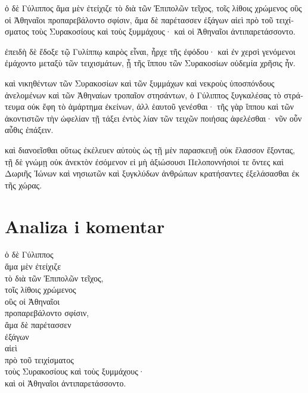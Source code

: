 {\large

\begin{greek}

\noindent ὁ δὲ Γύλιππος ἅμα μὲν ἐτείχιζε τὸ διὰ τῶν Ἐπιπολῶν τεῖχος, τοῖς λίθοις χρώμενος οὓς οἱ Ἀθηναῖοι προπαρεβάλοντο σφίσιν, ἅμα δὲ παρέτασσεν ἐξάγων αἰεὶ πρὸ τοῦ τειχίσματος τοὺς Συρακοσίους καὶ τοὺς ξυμμάχους· καὶ οἱ Ἀθηναῖοι ἀντιπαρετάσσοντο.

ἐπειδὴ δὲ ἔδοξε τῷ Γυλίππῳ καιρὸς εἶναι, ἦρχε τῆς ἐφόδου· καὶ ἐν χερσὶ γενόμενοι ἐμάχοντο μεταξὺ τῶν τειχισμάτων, ᾗ τῆς ἵππου τῶν Συρακοσίων οὐδεμία χρῆσις ἦν.

καὶ νικηθέντων τῶν Συρακοσίων καὶ τῶν ξυμμάχων καὶ νεκροὺς ὑποσπόνδους ἀνελομένων καὶ τῶν Ἀθηναίων τροπαῖον στησάντων, ὁ Γύλιππος ξυγκαλέσας τὸ στράτευμα οὐκ ἔφη τὸ ἁμάρτημα ἐκείνων, ἀλλ ἑαυτοῦ γενέσθαι· τῆς γὰρ ἵππου καὶ τῶν ἀκοντιστῶν τὴν ὠφελίαν τῇ τάξει ἐντὸς λίαν τῶν τειχῶν ποιήσας ἀφελέσθαι· νῦν οὖν αὖθις ἐπάξειν.

καὶ διανοεῖσθαι οὕτως ἐκέλευεν αὐτοὺς ὡς τῇ μὲν παρασκευῇ οὐκ ἔλασσον ἕξοντας, τῇ δὲ γνώμῃ οὐκ ἀνεκτὸν ἐσόμενον εἰ μὴ ἀξιώσουσι Πελοποννήσιοί τε ὄντες καὶ Δωριῆς Ἰώνων καὶ νησιωτῶν καὶ ξυγκλύδων ἀνθρώπων κρατήσαντες ἐξελάσασθαι ἐκ τῆς χώρας.

\end{greek}

}


\section*{Analiza i komentar}


{\large
\begin{greek}
\noindent ὁ δὲ Γύλιππος \\
ἅμα μὲν ἐτείχιζε \\
\tabto{2em} τὸ διὰ τῶν Ἐπιπολῶν τεῖχος, \\
τοῖς λίθοις χρώμενος \\
\tabto{2em} οὓς οἱ Ἀθηναῖοι \\
\tabto{2em} προπαρεβάλοντο σφίσιν, \\
ἅμα δὲ παρέτασσεν \\
\tabto{2em} ἐξάγων \\
\tabto{4em} αἰεὶ \\
\tabto{4em} πρὸ τοῦ τειχίσματος \\
\tabto{2em} τοὺς Συρακοσίους καὶ τοὺς ξυμμάχους· \\
καὶ οἱ Ἀθηναῖοι ἀντιπαρετάσσοντο.\\

\end{greek}
}

